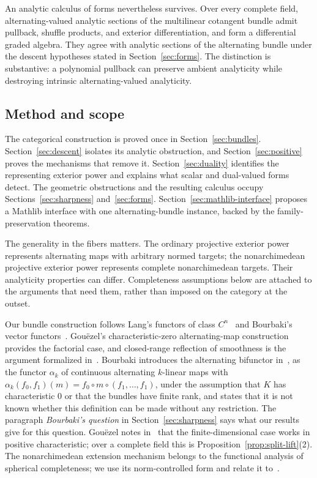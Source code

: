 \documentclass[11pt]{amsart}
\theoremstyle{definition}
\theoremstyle{remark}
\numberwithin{equation}{section}
\begin{document}
An analytic calculus of forms nevertheless survives. Over every complete field, alternating-valued
analytic sections of the multilinear cotangent bundle admit pullback, shuffle products, and exterior
differentiation, and form a differential graded algebra. They agree with analytic sections of the
alternating bundle under the descent hypotheses stated in Section~\ref{sec:forms}. The distinction is
substantive: a polynomial pullback can preserve ambient analyticity while destroying intrinsic
alternating-valued analyticity.

\subsection*{Method and scope}
The categorical construction is proved once in Section~\ref{sec:bundles}. Section~\ref{sec:descent}
isolates its analytic obstruction, and Section~\ref{sec:positive} proves the mechanisms that remove it.
Section~\ref{sec:duality} identifies the representing exterior power and explains what scalar and
dual-valued forms detect. The geometric obstructions and the resulting calculus occupy
Sections~\ref{sec:sharpness} and~\ref{sec:forms}.
Section~\ref{sec:mathlib-interface} proposes a Mathlib interface with one alternating-bundle instance, backed by the family-preservation theorems.

The generality in the fibers matters. The ordinary projective exterior power represents alternating
maps with arbitrary normed targets; the nonarchimedean projective exterior power represents complete
nonarchimedean targets. Their analyticity properties can differ. Completeness assumptions below are
attached to the arguments that need them, rather than imposed on the category at the outset.

Our bundle construction follows Lang's functors of class $C^n$~\cite[Ch.~III, \S4]{La} and Bourbaki's vector
functors~\cite[n\textsuperscript{o}~7.6]{Bou}.
Gou\"ezel's characteristic-zero alternating-map construction~\cite{G1,G2} provides the factorial case,
and closed-range reflection of smoothness is the argument formalized in~\cite{PR}.
Bourbaki introduces the alternating bifunctor in~\cite[n\textsuperscript{o}~7.8]{Bou}, as the functor $\alpha_k$ of continuous
alternating $k$-linear maps with $\alpha_k(f_0,f_1)(m)=f_0\circ m\circ(f_1,\ldots,f_1)$, under the assumption that $K$ has
characteristic $0$ or that the bundles have finite rank, and states that it is not known whether this definition can be
made without any restriction. The paragraph \emph{Bourbaki's question} in Section~\ref{sec:sharpness} says what our results give for this question.
Gou\"ezel notes in~\cite{G1} that the finite-dimensional case works in positive characteristic; over a complete field
this is Proposition~\ref{prop:split-lift}(2).
The nonarchimedean extension mechanism belongs to the functional analysis of spherical completeness;
we use its norm-controlled form and relate it to~\cite{In,Schi,Sch,Yuan}.
\end{document}
